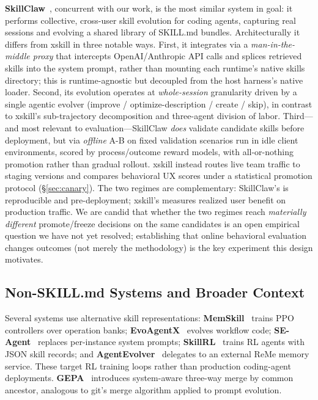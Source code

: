 \documentclass{article}
\begin{document}
\textbf{SkillClaw}~\citep{amapml2026skillclaw}, concurrent with our work, is the most similar system in goal: it performs collective, cross-user skill evolution for coding agents, capturing real sessions and evolving a shared library of SKILL.md bundles. Architecturally it differs from xskill in three notable ways. First, it integrates via a \emph{man-in-the-middle proxy} that intercepts OpenAI/Anthropic API calls and splices retrieved skills into the system prompt, rather than mounting each runtime's native skills directory; this is runtime-agnostic but decoupled from the host harness's native loader. Second, its evolution operates at \emph{whole-session} granularity driven by a single agentic evolver (improve / optimize-description / create / skip), in contrast to xskill's sub-trajectory decomposition and three-agent division of labor. Third---and most relevant to evaluation---SkillClaw \emph{does} validate candidate skills before deployment, but via \emph{offline} A-B on fixed validation scenarios run in idle client environments, scored by process/outcome reward models, with all-or-nothing promotion rather than gradual rollout. xskill instead routes live team traffic to staging versions and compares behavioral UX scores under a statistical promotion protocol (\S\ref{sec:canary}). The two regimes are complementary: SkillClaw's is reproducible and pre-deployment; xskill's measures realized user benefit on production traffic. We are candid that whether the two regimes reach \emph{materially different} promote/freeze decisions on the same candidates is an open empirical question we have not yet resolved; establishing that online behavioral evaluation changes outcomes (not merely the methodology) is the key experiment this design motivates.

\subsection{Non-SKILL.md Systems and Broader Context}

Several systems use alternative skill representations: \textbf{MemSkill}~\citep{memskill2025} trains PPO controllers over operation banks; \textbf{EvoAgentX}~\citep{evoagentx2025} evolves workflow code; \textbf{SE-Agent}~\citep{seagent2025} replaces per-instance system prompts; \textbf{SkillRL}~\citep{skillrl2025} trains RL agents with JSON skill records; and \textbf{AgentEvolver}~\citep{agentevolver2025} delegates to an external ReMe memory service. These target RL training loops rather than production coding-agent deployments. \textbf{GEPA}~\citep{gepa2025} introduces system-aware three-way merge by common ancestor, analogous to git's merge algorithm applied to prompt evolution.
\end{document}
